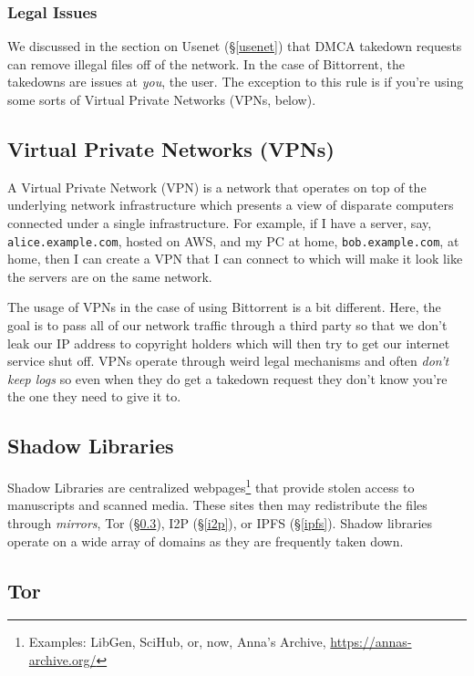 \subsubsection{Legal Issues}

We discussed in the section on Usenet (\S \ref{usenet}) that DMCA takedown
requests can remove illegal files off of the network. In the case of Bittorrent,
the takedowns are issues at \emph{you}, the user. The exception to this rule is
if you're using some sorts of Virtual Private Networks (VPNs, below).

\subsection{Virtual Private Networks (VPNs)}\label{vpn}

A Virtual Private Network (VPN) is a network that operates on top of the
underlying network infrastructure which presents a view of disparate computers
connected under a single infrastructure. For example, if I have a server, say,
\texttt{alice.example.com}, hosted on AWS, and my PC at home,
\texttt{bob.example.com}, at home, then I can create a VPN that I can connect to
which will make it look like the servers are on the same network.

The usage of VPNs in the case of using Bittorrent is a bit different. Here, the
goal is to pass all of our network traffic through a third party so that we
don't leak our IP address to copyright holders which will then try to get our
internet service shut off. VPNs operate through weird legal mechanisms and often
\emph{don't keep logs} so even when they do get a takedown request they don't
know you're the one they need to give it to.

\subsection{Shadow Libraries}\label{shadow}

Shadow Libraries are centralized webpages\footnote{Examples: LibGen, SciHub, or,
      now, Anna's Archive, \url{https://annas-archive.org/}} that provide stolen
access to manuscripts and scanned media. These sites then may redistribute
the files through \emph{mirrors}, Tor (\S \ref{tor}), I2P (\S \ref{i2p}),
or IPFS (\S \ref{ipfs}). Shadow libraries operate on a wide array of
domains as they are frequently taken down.

\subsection{Tor}\label{tor}

